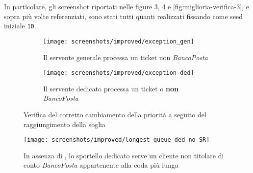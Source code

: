 In particolare, gli screenshot riportati nelle figure \ref{fig:miglioria-verifica-1}, \ref{fig:miglioria-verifica-2} e \ref{fig:miglioria-verifica-3}, e sopra più volte referenziati, sono stati tutti quanti realizzati fissando come seed iniziale \texttt{10}.

\begin{figure}[ht]
\centering
\captionsetup[subfigure]{justification=centering}
\begin{subfigure}[b]{0.475\textwidth}
\centering 
\texttt{[image: screenshots/improved/exception\_gen]}
\caption{Il servente generale processa un ticket non \textsl{BancoPosta}}   
\label{fig:miglioria-verifica-1a}
\end{subfigure}
\hfill
\begin{subfigure}[b]{0.475\textwidth}   
\centering 
\texttt{[image: screenshots/improved/exception\_ded]}
\caption{Il servente dedicato processa un ticket \uo{} o \pp{} \textbf{non} \textsl{BancoPosta}}    
\label{fig:miglioria-verifica-1b}
\end{subfigure}
\caption{Verifica del corretto cambiamento della priorità a seguito del raggiungimento della soglia}
\label{fig:miglioria-verifica-1}
\end{figure}

\captionsetup[figure]{justification=centering}
\begin{figure}[ht]
\centering
\texttt{[image: screenshots/improved/longest\_queue\_ded\_no\_SR]}
\caption{In assenza di \sr{}, lo sportello dedicato serve un cliente non titolare di conto \textsl{BancoPosta} appartenente alla coda più lunga}   
\label{fig:miglioria-verifica-2}
\end{figure}

